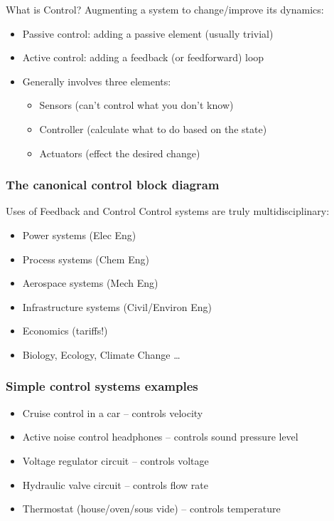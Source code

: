 \documentclass[10pt]{beamer-control}
\begin{document}
\begin{frame}{What is Control? }
  Augmenting a system to change/improve its dynamics:
  \begin{itemize}
    \item Passive control: adding a passive element (usually trivial)
    \item Active control: adding a feedback (or feedforward) loop
    \item Generally involves three elements:
      \begin{itemize}
        \item Sensors (can't control what you don't know)
        \item Controller (calculate what to do based on the state)
        \item Actuators (effect the desired change)
      \end{itemize}
  \end{itemize}
\end{frame}

\begin{frame}
  \frametitle{The canonical control block diagram}

\end{frame}

\begin{frame}{Uses of Feedback and Control }
  Control systems are truly multidisciplinary:
  \begin{itemize}
    \item Power systems (Elec Eng)
    \item Process systems (Chem Eng)
    \item Aerospace systems (Mech Eng)
    \item Infrastructure systems (Civil/Environ Eng)
    \item Economics (tariffs!)
    \item Biology, Ecology, Climate Change \dots
  \end{itemize}
\end{frame}


\begin{frame}
  \frametitle{Simple control systems examples}

  \begin{itemize}
    \item Cruise control in a car -- controls velocity
    \item Active noise control headphones -- controls sound pressure level
    \item Voltage regulator circuit -- controls voltage
    \item Hydraulic valve circuit -- controls flow rate
    \item Thermostat (house/oven/sous vide) -- controls temperature
  \end{itemize}

\end{frame}
\end{document}
